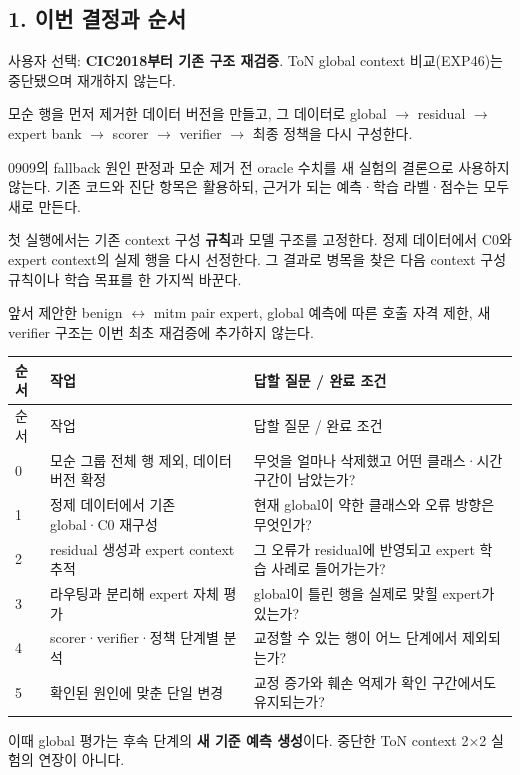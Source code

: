 \subsection{1. 이번 결정과 순서}
\par\noindent \textbullet\enspace 사용자 선택: \textbf{CIC2018부터 기존 구조 재검증}. ToN global context 비교(EXP46)는 중단됐으며 재개하지 않는다.


\par\noindent \textbullet\enspace 모순 행을 먼저 제거한 데이터 버전을 만들고, 그 데이터로 global  \ensuremath{\rightarrow}  residual  \ensuremath{\rightarrow}  expert bank  \ensuremath{\rightarrow}  scorer  \ensuremath{\rightarrow}  verifier  \ensuremath{\rightarrow}  최종 정책을 다시 구성한다.


\par\noindent \textbullet\enspace 0909의 fallback 원인 판정과 모순 제거 전 oracle 수치를 새 실험의 결론으로 사용하지 않는다. 기존 코드와 진단 항목은 활용하되, 근거가 되는 예측·학습 라벨·점수는 모두 새로 만든다.


\par\noindent \textbullet\enspace 첫 실행에서는 기존 context 구성 \textbf{규칙}과 모델 구조를 고정한다. 정제 데이터에서 C0와 expert context의 실제 행을 다시 선정한다. 그 결과로 병목을 찾은 다음 context 구성 규칙이나 학습 목표를 한 가지씩 바꾼다.


\par\noindent \textbullet\enspace 앞서 제안한 benign \ensuremath{\leftrightarrow} mitm pair expert, global 예측에 따른 호출 자격 제한, 새 verifier 구조는 이번 최초 재검증에 추가하지 않는다.


\begingroup
\footnotesize
\begin{longtable}{>{\raggedleft\arraybackslash}p{}>{\raggedright\arraybackslash}p{}>{\raggedright\arraybackslash}p{}}
\toprule
순서 & 작업 & 답할 질문 /\allowbreak{} 완료 조건 \\ \midrule
\endfirsthead
순서 & 작업 & 답할 질문 /\allowbreak{} 완료 조건 \\ \midrule
\endhead
{}0 & 모순 그룹 전체 행 제외, 데이터 버전 확정 & 무엇을 얼마나 삭제했고 어떤 클래스·시간 구간이 남았는가? \\
{}1 & 정제 데이터에서 기존 global·C0 재구성 & 현재 global이 약한 클래스와 오류 방향은 무엇인가? \\
{}2 & residual 생성과 expert context 추적 & 그 오류가 residual에 반영되고 expert 학습 사례로 들어가는가? \\
{}3 & 라우팅과 분리해 expert 자체 평가 & global이 틀린 행을 실제로 맞힐 expert가 있는가? \\
{}4 & scorer·verifier·정책 단계별 분석 & 교정할 수 있는 행이 어느 단계에서 제외되는가? \\
{}5 & 확인된 원인에 맞춘 단일 변경 & 교정 증가와 훼손 억제가 확인 구간에서도 유지되는가? \\
\bottomrule
\end{longtable}
\endgroup
이때 global 평가는 후속 단계의 \textbf{새 기준 예측 생성}이다. 중단한 ToN context 2×2 실험의 연장이 아니다.

